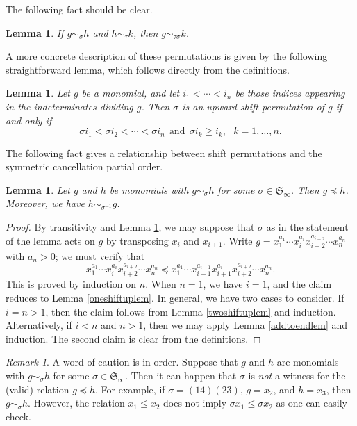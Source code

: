 \documentclass{amsart}
\newtheorem{lemma}[theorem]{Lemma}
\theoremstyle{definition}
\theoremstyle{remark}
\newtheorem{remark}[theorem]{Remark}
\numberwithin{equation}{section}
\newcommand{\<}{\langle}
\renewcommand{\>}{\rangle}
\begin{document}
The following fact should be clear.

\begin{lemma}\label{translem}
If $g \sim_{\sigma} h$ and $h \sim_{\tau} k$, then $g \sim_{\tau \sigma} k$.
\end{lemma}

A more concrete description of these permutations is given by the
following straightforward lemma, which follows directly from the
definitions.
 
\begin{lemma}\label{shiftcharac}
Let $g$ be a monomial, and let $i_1 < \cdots < i_n$ be those 
indices appearing in the indeterminates dividing $g$.
Then $\sigma$ is an upward shift permutation of $g$ if and only if 
\[\sigma i_1 < \sigma i_2 <  \cdots < \sigma i_n \ \ \text{and} \ \  \sigma i_k \geq i_k, \ \ \ k = 1,\ldots,n.\]
\end{lemma}

The following fact gives a relationship between shift permutations and 
the symmetric cancellation partial order.

\begin{lemma}\label{invshiftlem}
Let $g$ and $h$ be monomials with $g \sim_{\sigma} h$ for some $\sigma \in {\mathfrak S}_\infty$. 
Then $g \preceq h$.  Moreover, we have $h \sim_{\sigma^{-1}} g$.
\end{lemma}
\begin{proof}
By transitivity and Lemma \ref{translem}, we may 
suppose that $\sigma$ as in the statement of the lemma acts on $g$ by
transposing $x_i$ and $x_{i+1}$.  
Write $g = x_1^{a_1} \cdots x_i^{a_i}x_{i+2}^{a_{i+2}} \cdots x_n^{a_n}$ with
$a_n > 0$; we must verify that 
\[ x_1^{a_1} \cdots x_i^{a_i}x_{i+2}^{a_{i+2}} \cdots x_n^{a_n}
\preceq x_1^{a_1} \cdots x_{i-1}^{a_{i-1}}x_{i+1}^{a_i} x_{i+2}^{a_{i+2}} \cdots x_n^{a_n}.\]
This is proved by induction on $n$.  When $n=1$, we have $i =1$, and the
claim reduces to Lemma \ref{oneshiftuplem}.  In general, we have two cases to consider.
If $i = n > 1$, then the claim follows from Lemma \ref{twoshiftuplem} and induction.
Alternatively, if $i < n$ and $n > 1$, then we may apply Lemma \ref{addtoendlem} and 
induction.  The second claim is clear from the definitions.
\end{proof}

\begin{remark}\label{carefulwitness}
A word of caution is in order.  Suppose that $g$ and $h$ are monomials with 
$g \sim_{\sigma} h$ for some  $\sigma \in {\mathfrak S}_\infty$.  Then it can happen that
$\sigma$ is \textit{not} a witness for the (valid) relation $g \preceq h$.  For example, if $\sigma = (14)(23)$, 
$g = x_2$, and $h = x_3$, then $g \sim_{\sigma} h$.  However, the relation $x_1 \leq x_2$
does not imply $\sigma x_1 \leq \sigma x_2$ as one can easily check.
\end{remark}
\end{document}
